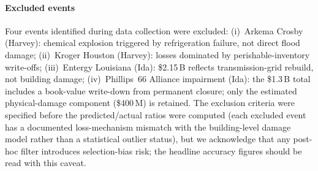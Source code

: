 \paragraph{Excluded events} Four events identified during data collection were excluded: (i)~Arkema Crosby (Harvey): chemical explosion triggered by refrigeration failure, not direct flood damage; (ii)~Kroger Houston (Harvey): losses dominated by perishable-inventory write-offs; (iii)~Entergy Louisiana (Ida): \$2.15\,B reflects transmission-grid rebuild, not building damage; (iv)~Phillips~66 Alliance impairment (Ida): the \$1.3\,B total includes a book-value write-down from permanent closure; only the estimated physical-damage component (\$400\,M) is retained. The exclusion criteria were specified before the predicted/actual ratios were computed (each excluded event has a documented loss-mechanism mismatch with the building-level damage model rather than a statistical outlier status), but we acknowledge that any post-hoc filter introduces selection-bias risk; the headline accuracy figures should be read with this caveat.
